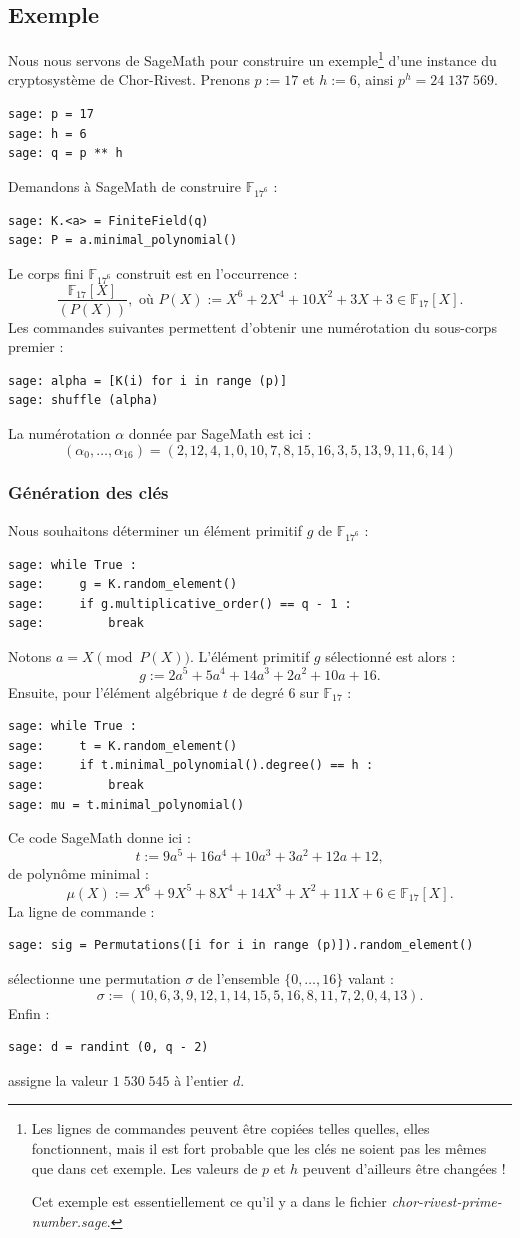 \documentclass[a4paper, titlepage, 11pt]{article}
\theoremstyle{definition}
\theoremstyle{remark}
\def\gf #1{\mathbb{F}_{#1}}
\begin{document}
\subsection{Exemple}
Nous nous servons de SageMath pour construire un exemple\footnote{Les lignes de commandes peuvent être copiées telles quelles, elles fonctionnent, mais il est fort probable que les clés ne soient pas les mêmes que dans cet exemple. Les valeurs de $p$ et $h$ peuvent d'ailleurs être changées !

Cet exemple est essentiellement ce qu'il y a dans le fichier \textit{chor-rivest-prime-number.sage}.} d'une instance du cryptosystème de Chor-Rivest. Prenons $p := 17$ et $h := 6$, ainsi $p^h = 24\;137\;569$.
\begin{verbatim}
sage: p = 17
sage: h = 6
sage: q = p ** h
\end{verbatim}
Demandons à SageMath de construire $\gf{17^6}$ :
\begin{verbatim}
sage: K.<a> = FiniteField(q)
sage: P = a.minimal_polynomial()
\end{verbatim}
Le corps fini $\gf{17^6}$ construit est en l’occurrence :
$$\frac{\gf{17}[X]}{(P(X))}, \text{ où } P(X) := X^6 + 2X^4 + 10 X^2 +3X +3\in  \gf{17}[X].$$
Les commandes suivantes permettent d'obtenir une numérotation du sous-corps premier :
\begin{verbatim}
sage: alpha = [K(i) for i in range (p)]
sage: shuffle (alpha)
\end{verbatim}
La numérotation $\alpha$ donnée par SageMath est ici :
$$(\alpha_0, \dots, \alpha_{16}) = (2, 12, 4, 1, 0, 10, 7, 8, 15, 16, 3, 5, 13, 9, 11, 6, 14)$$
\subsubsection{Génération des clés}
Nous souhaitons déterminer un élément primitif $g$ de $\gf{17^6}$ :
\begin{verbatim}
sage: while True :
sage:     g = K.random_element()
sage:     if g.multiplicative_order() == q - 1 :
sage:         break
\end{verbatim}
Notons $a = X \pmod{P(X)}$. L'élément primitif $g$ sélectionné est alors :
$$g := 2a^5 + 5a^4 + 14a^3 + 2a^2 + 10a + 16.$$
Ensuite, pour l'élément algébrique $t$ de degré $6$ sur $\gf{17}$ :
\begin{verbatim}
sage: while True :
sage:     t = K.random_element()
sage:     if t.minimal_polynomial().degree() == h :
sage:         break
sage: mu = t.minimal_polynomial()
\end{verbatim}
Ce code SageMath donne ici :
$$t := 9a^5 + 16a^4 + 10a^3 + 3a^2 + 12a + 12,$$
de polynôme minimal :
$$\mu(X) := X^6 + 9X^5 + 8X^4 + 14X^3 + X^2 + 11X + 6\in\gf{17}[X].$$
La ligne de commande :
\begin{verbatim}
sage: sig = Permutations([i for i in range (p)]).random_element()
\end{verbatim}
sélectionne une permutation $\sigma$ de l'ensemble $\{0, \dots, 16\}$ valant :
$$\sigma := (10, 6, 3, 9, 12, 1, 14, 15, 5, 16, 8, 11, 7, 2, 0, 4, 13).$$
Enfin :
\begin{verbatim}
sage: d = randint (0, q - 2)
\end{verbatim}
assigne la valeur $1\;530\;545$ à l'entier $d$.
\end{document}
